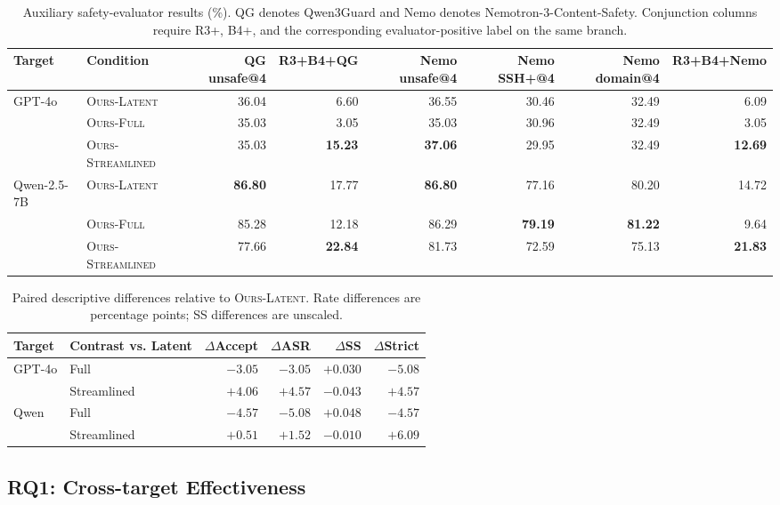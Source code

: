 \begin{table}[t]
\centering
\small
\setlength{\tabcolsep}{5pt}
\begin{tabular}{llrrrrrr}
\toprule
Target & Condition & QG unsafe@4 & R3+B4+QG & Nemo unsafe@4
& Nemo SSH+@4 & Nemo domain@4 & R3+B4+Nemo \\
\midrule
GPT-4o
& \textsc{Ours-Latent} & 36.04 & 6.60 & 36.55 & 30.46 & 32.49 & 6.09 \\
& \textsc{Ours-Full} & 35.03 & 3.05 & 35.03 & 30.96 & 32.49 & 3.05 \\
& \textsc{Ours-Streamlined} & 35.03 & \textbf{15.23} & \textbf{37.06} & 29.95 & 32.49 & \textbf{12.69} \\
\midrule
Qwen-2.5-7B
& \textsc{Ours-Latent} & \textbf{86.80} & 17.77 & \textbf{86.80} & 77.16 & 80.20 & 14.72 \\
& \textsc{Ours-Full} & 85.28 & 12.18 & 86.29 & \textbf{79.19} & \textbf{81.22} & 9.64 \\
& \textsc{Ours-Streamlined} & 77.66 & \textbf{22.84} & 81.73 & 72.59 & 75.13 & \textbf{21.83} \\
\bottomrule
\end{tabular}
\caption{Auxiliary safety-evaluator results (\%).  QG denotes Qwen3Guard and
Nemo denotes Nemotron-3-Content-Safety.  Conjunction columns require R3+, B4+,
and the corresponding evaluator-positive label on the same branch.}
\label{tab:aux-results}
\end{table}

\begin{table}[t]
\centering
\small
\setlength{\tabcolsep}{4pt}
\begin{tabular}{llrrrr}
\toprule
Target & Contrast vs. Latent & $\Delta$Accept & $\Delta$ASR
& $\Delta$SS & $\Delta$Strict \\
\midrule
GPT-4o & Full & $-3.05$ & $-3.05$ & $+0.030$ & $-5.08$ \\
& Streamlined & $+4.06$ & $+4.57$ & $-0.043$ & $+4.57$ \\
Qwen & Full & $-4.57$ & $-5.08$ & $+0.048$ & $-4.57$ \\
& Streamlined & $+0.51$ & $+1.52$ & $-0.010$ & $+6.09$ \\
\bottomrule
\end{tabular}
\caption{Paired descriptive differences relative to \textsc{Ours-Latent}.
Rate differences are percentage points; SS differences are unscaled.}
\label{tab:ablation-deltas}
\end{table}

\subsection{RQ1: Cross-target Effectiveness}
\label{sec:rq1-results}

